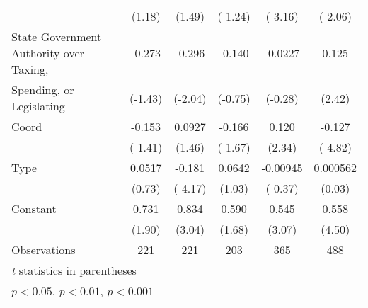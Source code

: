 {\begin{tabular}{l*{5}{c}}
                                        &    (1.18)         &    (1.49)         &   (-1.24)         &   (-3.16)         &   (-2.06)         \\
\addlinespace
State Government Authority over Taxing, &    -0.273         &    -0.296\sym{*}  &    -0.140         &   -0.0227         &     0.125\sym{*}  \\
Spending, or Legislating                &   (-1.43)         &   (-2.04)         &   (-0.75)         &   (-0.28)         &    (2.42)         \\
\addlinespace
Coord                                   &    -0.153         &    0.0927         &    -0.166         &     0.120\sym{*}  &    -0.127\sym{***}\\
                                        &   (-1.41)         &    (1.46)         &   (-1.67)         &    (2.34)         &   (-4.82)         \\
\addlinespace
Type                                    &    0.0517         &    -0.181\sym{***}&    0.0642         &  -0.00945         &  0.000562         \\
                                        &    (0.73)         &   (-4.17)         &    (1.03)         &   (-0.37)         &    (0.03)         \\
\addlinespace
Constant                                &     0.731         &     0.834\sym{**} &     0.590         &     0.545\sym{**} &     0.558\sym{***}\\
                                        &    (1.90)         &    (3.04)         &    (1.68)         &    (3.07)         &    (4.50)         \\
\midrule
Observations                            &       221         &       221         &       203         &       365         &       488         \\
\bottomrule
\multicolumn{6}{l}{\footnotesize \textit{t} statistics in parentheses}\\
\multicolumn{6}{l}{\footnotesize \sym{*} \(p<0.05\), \sym{**} \(p<0.01\), \sym{***} \(p<0.001\)}\\
\end{tabular}
}
